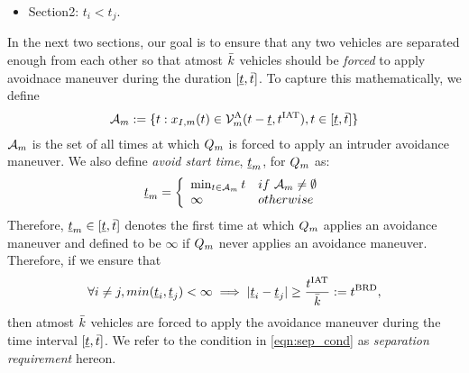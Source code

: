 {\begin{itemize}
\begin{itemize}
\item Section12: Next we want to make sure that $\veh_i$ is far away from this set such that the intruder will need atleast a duration of $\brd$ to reach any state such that $\state_{\intr,i}$ is on the boundary of the avoid set of $\veh_i$. In relative co-ordinates, if we compute min-min set and augment it on set in Section 11, and ensure that the boundary of the avoid region is outside this augmented set then we are done. Draw a table listing the duration of each set. Mention the duration relationships. Draw a diagram showing different sets. 
\item Section13: Obstacle computation. First compute the directly induced obstacle by $\veh_j$ at time $t$ for all possible $\tsa$. Then compute the obstacle that $\veh_i$ need to avoid at any future time for different $\tsa$. Therefore, compute the BRS that it needs to avoid at $\tsa$.    
\end{itemize}
\item Section2: $t_i < t_j$.
\end{itemize}
}

In the next two sections, our goal is to ensure that any two vehicles are separated enough from each other so that %
atmost $\bar{k}$ vehicles should be \textit{forced} to apply avoidnace maneuver during the duration $[\underline{t}, \bar{t}]$. To capture this mathematically, we define 
\begin{equation*}
\mathcal{A}_{m} := \{t: x_{I,m}(t) \in \mathcal{V}^{\text{A}}_{m}(t-\underline{t}, t^\text{IAT}), t \in [\underline{t}, \bar{t}]\}
\end{equation*} 
$\mathcal{A}_{m}$ is the set of all times at which $Q_m$ is forced to apply an intruder avoidance maneuver. We also define \textit{avoid start time}, $\underline{t}_m$, for $Q_m$ as:
\begin{equation}
\underline{t}_m  = 
\left \{ 
\begin{array}{ll}
\min_{t \in  \mathcal{A}_{m}} t & \relax{if~} \mathcal{A}_{m} \neq \emptyset\\
\infty & \relax{otherwise}
\end{array}
\right.
\end{equation}  
Therefore, $\underline{t}_m \in [\underline{t}, \bar{t}]$ denotes the first time at which $Q_m$ applies an avoidance maneuver and defined to be $\infty$ if $Q_m$ never applies an avoidance maneuver. %
Therefore, if we ensure that 
\begin{equation} \label{eqn:sep_cond}
\forall i \neq j, min(\tsa_i, \tsa_j)< \infty \implies |\tsa_i - \tsa_j| \geq \frac{\iat}{\nva} := \brd,
\end{equation}
then atmost $\bar{k}$ vehicles are forced to apply the avoidance maneuver during the time interval $[\underline{t}, \bar{t}]$. We refer to the condition in \eqref{eqn:sep_cond} as \textit{separation requirement} hereon. 

